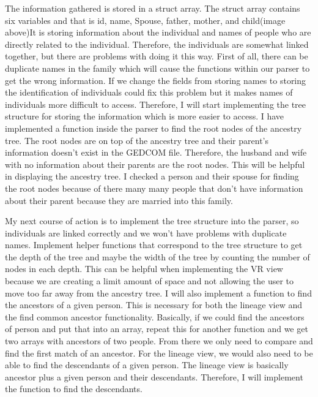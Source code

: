 \documentclass[onecolumn, draftclsnofoot, 10pt, compsoc]{IEEEtran}
\begin{document}
\begin{singlespace}
\newline
The information gathered is stored in a struct array. The struct array contains six variables and that is id, name, Spouse, father, mother, and child(image above)It is storing information about the individual and names of people who are directly related to the individual. Therefore, the individuals are somewhat linked together, but there are problems with doing it this way. First of all, there can be duplicate names in the family which will cause the functions within our parser to get the wrong information. If we change the fields from storing names to storing the identification of individuals could fix this problem but it makes names of individuals more difficult to access. Therefore, I will start implementing the tree structure for storing the information which is more easier to access. I have implemented a function inside the parser to find the root nodes of the ancestry tree. The root nodes are on top of the ancestry tree and their parent's information doesn't exist in the GEDCOM file. Therefore, the husband and wife with no information about their parents are the root nodes. This will be helpful in displaying the ancestry tree. I checked a person and their spouse for finding the root nodes because of there many many people that don’t have information about their parent because they are married into this family. 

My next course of action is to implement the tree structure into the parser, so individuals are linked correctly and we won't have problems with duplicate names. Implement helper functions that correspond to the tree structure to get the depth of the tree and maybe the width of the tree by counting the number of nodes in each depth. This can be helpful when implementing the VR view because we are creating a limit amount of space and not allowing the user to move too far away from the ancestry tree. I will also implement a function to find the ancestors of a given person. This is necessary for both the lineage view and the find common ancestor functionality. Basically, if we could find the ancestors of person and put that into an array, repeat this for another function and we get two arrays with ancestors of two people. From there we only need to compare and find the first match of an ancestor. For the lineage view, we would also need to be able to find the descendants of a given person. The lineage view is basically ancestor plus a given person and their descendants. Therefore, I will implement the function to find the descendants. 


\end{singlespace}
\end{document}

